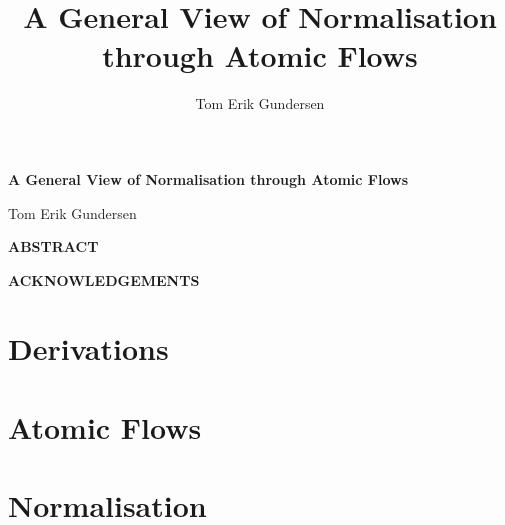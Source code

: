 \documentclass[a4paper,11pt]{report}
\author{Tom Erik Gundersen}
\title{A General View of Normalisation through Atomic Flows}
\begin{document}

%
%
%
\renewcommand{\thepage}{\roman{page}}
\maketitle

\clearpage
\thispagestyle{plain}
{\begin{center}
\vspace*{1.7cm}
{\def\baselinestretch{1.2}\Huge\bf A General View of Normalisation through Atomic Flows \par}
\vspace{4cm}
{\begin{center}{\huge Tom Erik Gundersen }\end{center}}
\end{center}}

\clearpage
\thispagestyle{plain}
\begin{center}
\vspace{20pt}
  \Large\bfseries{ABSTRACT}
\end{center}


\clearpage
\thispagestyle{plain}
\begin{center}
  {\Large\bfseries{ACKNOWLEDGEMENTS}}
\end{center}




{
\tableofcontents
}
\newpage
{}

\part{Derivations}


\part{Atomic Flows}



\part{Normalisation}



%
\printindex
%
%
%

\small

\end{document}
